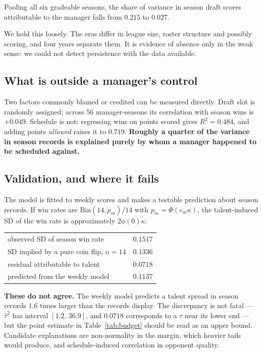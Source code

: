 \documentclass[11pt]{article}
\begin{document}
Pooling all six gradeable seasons, the share of variance in season draft scores
attributable to the manager falls from $0.215$ to $0.027$.

We hold this loosely. The eras differ in league size, roster structure and
possibly scoring, and four years separate them. It is evidence of absence only
in the weak sense: we could not detect persistence with the data available.

\subsection{What is outside a manager's control}

Two factors commonly blamed or credited can be measured directly. Draft slot is
randomly assigned; across 56 manager-seasons its correlation with season wins is
$+0.049$. Schedule is not: regressing wins on points scored gives $R^2 = 0.484$,
and adding points \emph{allowed} raises it to $0.719$. \textbf{Roughly a quarter
of the variance in season records is explained purely by whom a manager happened
to be scheduled against.}

\subsection{Validation, and where it fails}\label{sec:validation}

The model is fitted to weekly scores and makes a testable prediction about season
records. If win rates are $\mathrm{Bin}(14,p_m)/14$ with $p_m = \Phi(c_m\kappa)$,
the talent-induced SD of the win rate is approximately $2\phi(0)\kappa$.

\begin{center}\small
\begin{tabular}{lr}
\toprule
observed SD of season win rate & $0.1517$ \\
SD implied by a pure coin flip, $n=14$ & $0.1336$ \\
residual attributable to talent & $0.0718$ \\
predicted from the weekly model & $0.1137$ \\
\bottomrule
\end{tabular}
\end{center}

\textbf{These do not agree.} The weekly model predicts a talent spread in season
records $1.6$ times larger than the records display. The discrepancy is not
fatal --- $\widehat\tau^2$ has interval $[1.2,\,36.9]$, and $0.0718$ corresponds
to a $\tau$ near its lower end --- but the point estimate in
Table~\ref{tab:budget} should be read as an upper bound. Candidate explanations
are non-normality in the margin, which heavier tails would produce, and
schedule-induced correlation in opponent quality.
\end{document}
